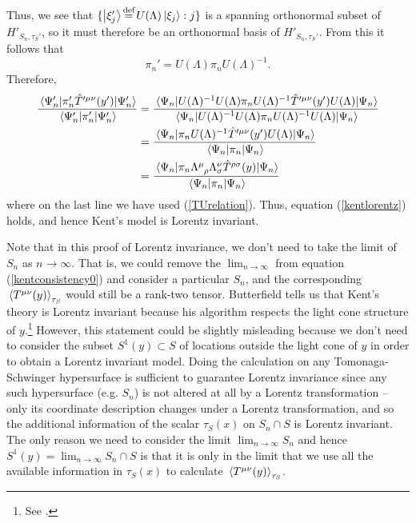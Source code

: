 Thus, we see that $\{\ket{\xi_j'}\myeq U(\Lambda)\ket{\xi_j}:j\}$ is a spanning orthonormal subset of $H'_{S_n,\tau_S'}$, so it must therefore be an orthonormal basis of $H'_{S_n,\tau_S'}$. From this it follows that 
\begin{equation}\label{pipidash}
\pi_n'=U(\Lambda)\pi_nU(\Lambda)^{-1}.
\end{equation}
Therefore, 
\begin{equation}\label{kentlorentz2}
\begin{split}
\frac{\ev{\pi_n'\hat{T}^{\prime\mu\nu}(y')}{\Psi_n'}}{\ev{\pi_n'}{\Psi_n'}}&=\frac{\ev{U(\Lambda)^{-1}U(\Lambda)\pi_nU(\Lambda)^{-1}\hat{T}^{\prime\mu\nu}(y')U(\Lambda)}{\Psi_n}}{\ev{U(\Lambda)^{-1}U(\Lambda)\pi_n U(\Lambda)^{-1}U(\Lambda)}{\Psi_n}}\\
&=\frac{\ev{\pi_nU(\Lambda)^{-1}\hat{T}^{\prime\mu\nu}(y')U(\Lambda)}{\Psi_n}}{\ev{\pi_n}{\Psi_n}}\\
&=\frac{\ev{\pi_n\Lambda\indices{^\mu_\rho}\Lambda{^\nu_\sigma}\hat{T}^{\rho\sigma}(y)}{\Psi_n}}{\ev{\pi_n }{\Psi_n}}
\end{split}
\end{equation}
where on the last line we have used (\ref{TUrelation}). Thus, equation (\ref{kentlorentz}) holds, and hence Kent's model is Lorentz invariant.

Note that in this proof of Lorentz invariance, we don't need to take the limit of $S_n$ as $n\rightarrow\infty$. That is, we could remove the $\lim_{n\rightarrow\infty}$ from equation (\ref{kentconsistency0}) and consider a particular $S_n$, and the corresponding $\ev*{T^{\mu\nu}(y)}_{\tau_S}$ would still be a rank-two tensor. Butterfield tells us that Kent's theory is  Lorentz invariant because his algorithm respects the light cone structure of $y$.\footnote{See \cite[30]{Butterfield}.} However, this statement could be slightly misleading because we don't need to consider the subset $S^1(y)\subset S$ of locations outside the light cone of $y$ in order to obtain a Lorentz invariant model. Doing the calculation on any Tomonaga-Schwinger hypersurface is sufficient to guarantee Lorentz invariance since any such hypersurface (e.g. $S_n$) is not altered at all by a Lorentz transformation -- only its coordinate description changes under a Lorentz transformation, and so the additional information of the scalar $\tau_S(x)$ on $S_n\cap S$ is Lorentz invariant. The only reason we need to consider the limit $\lim_{n\rightarrow \infty}S_n$ and hence $S^1(y)=\lim_{n\rightarrow \infty}S_n\cap S$ is that it is only in the limit that we use all the available information in $\tau_S(x)$ to calculate $\ev*{T^{\mu\nu}(y)}_{\tau_S}$. 



